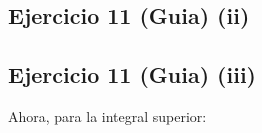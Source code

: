 \subsection{Ejercicio 11 (Guia) (ii)}  


\subsection{Ejercicio 11 (Guia) (iii)}  





	Ahora, para la integral superior:


